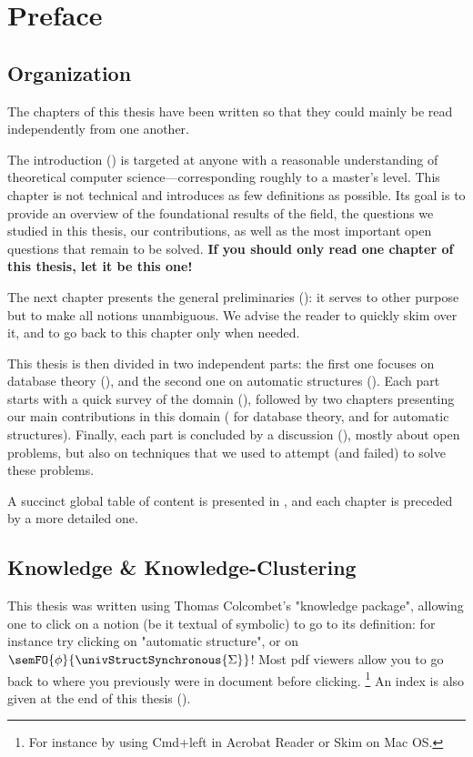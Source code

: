 \chapter*{Preface}

\section*{Organization}

The chapters of this thesis have been written so that they could mainly
be read independently from one another.

The introduction () is targeted at anyone with
a reasonable understanding of theoretical computer science---corresponding roughly
to a master's level. This chapter is not technical and introduces as few definitions
as possible. Its goal is to provide an overview of the foundational results of the
field, the questions we studied in this thesis, our contributions, as well
as the most important open questions that remain to be solved.
\textbf{If you should only read one chapter of this thesis, let it be this one!}

The next chapter presents the general preliminaries ():
it serves to other purpose but to make all notions unambiguous. We advise
the reader to quickly skim over it, and to go back to this chapter only when
needed.

This thesis is then divided in two independent parts:
the first one focuses on database theory (),
and the second one on automatic structures ().
Each part starts with a quick survey of the domain
(),
followed by two chapters presenting our main contributions in this domain
( for database theory,
and  for automatic structures).
Finally, each part is concluded by a discussion (),
mostly about open problems, but also on techniques that we used to attempt (and failed) to solve these problems.

A succinct global table of content is presented in ,
and each chapter is preceded by a more detailed one.

\section*{Knowledge \& Knowledge-Clustering}
This thesis was written using Thomas Colcombet's "knowledge package", allowing
one to click on a notion (be it textual of symbolic) to go to its definition:
for instance try clicking on "automatic structure", or on
$\semFO{\phi}{\univStructSynchronous{\Sigma}}$!
Most pdf viewers allow you to go back to where you previously were
in document before clicking.%
\footnote{For instance
by using Cmd+left in Acrobat Reader or Skim on Mac OS.}
An index is also given at the end of this thesis ().

